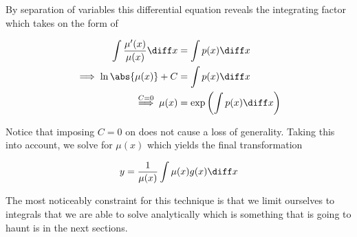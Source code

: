 \begin{flushleft}
	By separation of variables this differential equation reveals the integrating
	factor which takes on the form of
\end{flushleft}

\begin{align}
	\int \frac{\mu^\prime(x)}{\mu(x)} \diff x & = \int p(x) \diff x                 \nonumber                            \\
	\implies \ln\abs{\mu(x)} + C              & = \int p(x) \diff x                  \nonumber                           \\
	\overset{C=0}{\implies} \mu(x)            & = \exp\left(\int p(x) \diff x\right) \label{eq-meth-of-int-factors-tmp2}
\end{align}

\begin{flushleft}
	Notice that imposing $C=0$ on 
	does not cause a loss of generality. Taking this into account, we solve
	 for $\mu(x)$ which yields
	the final transformation
\end{flushleft}

\begin{equation}\label{eq-meth-of-int-factors}
	y = \frac{1}{\mu(x)}\int \mu(x)g(x)\diff x
\end{equation}

\begin{flushleft}
	The most noticeably constraint for this technique is that we limit ourselves
	to integrals that we are able to solve analytically which is something that is
	going to haunt is in the next sections.
\end{flushleft}

